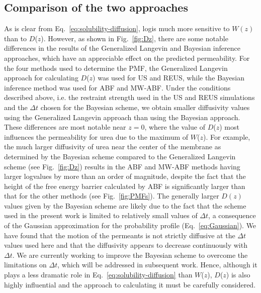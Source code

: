 \subsection{Comparison of the two approaches}
As is clear from Eq.~\ref{eq:solubility-diffusion}, log\perm is much more sensitive to $W(z)$ than to $D$($z$).
However, as shown in Fig.~\ref{fig:Dz}, there are some notable differences
in the results of the Generalized Langevin and Bayesian inference approaches, which
have an appreciable effect on the predicted permeability.
For the four methods used to determine the PMF, the Generalized Langevin approach
for calculating $D$($z$) was used for US and REUS, while the Bayesian inference method
was used for ABF and MW-ABF.
Under the conditions described above, i.e. the restraint strength used in the US and REUS
simulations and the $\Delta t$ chosen for the Bayesian scheme,
we obtain smaller diffusivity values using
the Generalized Langevin approach than using the Bayesian approach.
These differences are most notable near $z=0$, where the value of $D$($z$)
most influences the permeability for urea due to the maximum of $W$($z$).
For example, the much larger diffusivity of urea
near the center of the membrane as determined by the Bayesian scheme
compared to the Generalized Langevin scheme (see Fig.~\ref{fig:Dz})
results in the ABF and MW-ABF methods having larger log\perm values by more than
an order of magnitude, despite the fact that the
height of the free energy barrier calculated by ABF is significantly
larger than that for the other methods (see Fig.~\ref{fig:PMFs}).
The generally larger $D(z)$ values given by
the Bayesian scheme are likely due to the fact that
the scheme used in the present work is limited to relatively small values of $\Delta t$, a consequence of the Gaussian approximation for the probability profile (Eq.~\ref{eq:Gaussian}). We have found that the motion of the permeants is not strictly diffusive at the $\Delta t$ values used here and that the diffusivity appears to decrease continuously with $\Delta t$. We are currently working to improve the Bayesian scheme to overcome the limitations on $\Delta t$, which will be addressed in subsequent work.
Hence, although it plays a less dramatic role in Eq.~\ref{eq:solubility-diffusion} than $W$($z$),
$D$($z$) is also highly influential and the approach to calculating it must be
carefully considered.

